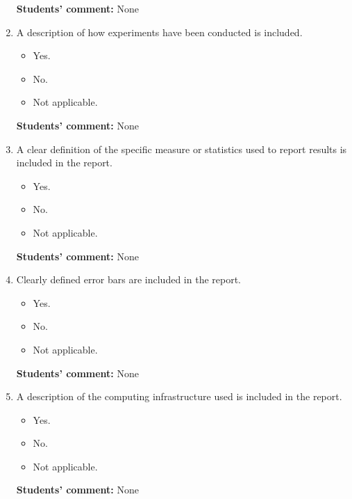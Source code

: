 \documentclass{article}
\begin{document}
\begin{enumerate}
    \textbf{Students' comment:} None
    
    \item A description of how experiments have been conducted is included.
    \begin{itemize}
        \item [\faSquareO] Yes.
        \item [\faSquareO] No.
        \item [\faSquareO] Not applicable.
    \end{itemize}
    
    \textbf{Students' comment:} None
    
    \item A clear definition of the specific measure or statistics used to report results is included in the report.
    \begin{itemize}
        \item [\faSquareO] Yes.
        \item [\faSquareO] No.
        \item [\faSquareO] Not applicable.
    \end{itemize}
    
    \textbf{Students' comment:} None
    
    \item Clearly defined error bars are included in the report.
    \begin{itemize}
        \item [\faSquareO] Yes.
        \item [\faSquareO] No.
        \item [\faSquareO] Not applicable.
    \end{itemize}
    
    \textbf{Students' comment:} None
    
    \item A description of the computing infrastructure used is included in the report.
    \begin{itemize}
        \item [\faSquareO] Yes.
        \item [\faSquareO] No.
        \item [\faSquareO] Not applicable.
    \end{itemize}
    
    \textbf{Students' comment:} None
\end{enumerate}
\end{document}

